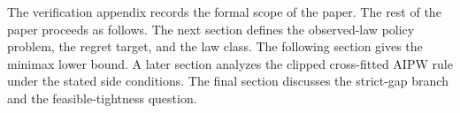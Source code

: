 The verification appendix records the formal scope of the paper.  The rest of the paper proceeds as follows.  The next section defines the observed-law policy problem, the regret target, and the law class.  The following section gives the minimax lower bound.  A later section analyzes the clipped cross-fitted AIPW rule under the stated side conditions.  The final section discusses the strict-gap branch and the feasible-tightness question.
